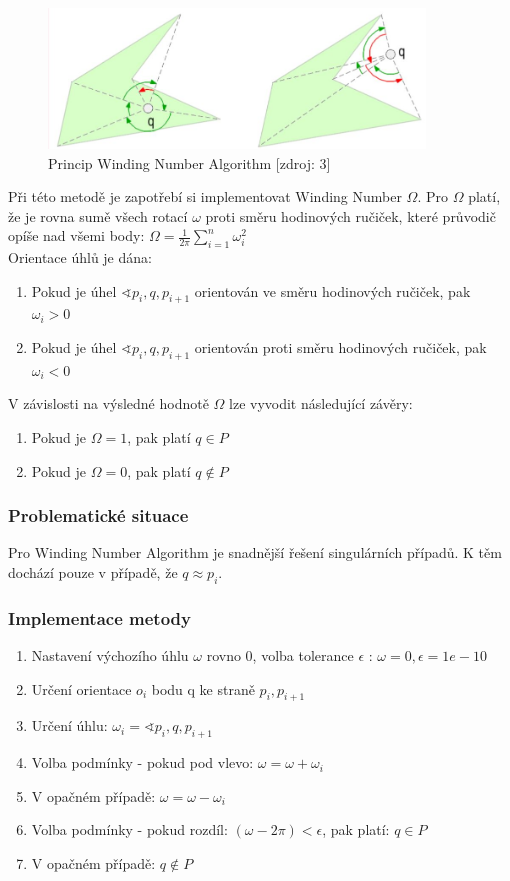 \documentclass[a4paper, 12pt]{article}
\begin{document}
\begin{figure}[h]
	\centering
	\includegraphics[width=10cm]{winding.jpg}
	\caption{Princip Winding Number Algorithm [zdroj: 3]}
\end{figure}

Při této metodě je zapotřebí si implementovat Winding Number $\Omega$. Pro $\Omega$ platí, že je rovna sumě všech rotací $\omega$ proti směru hodinových ručiček, které průvodič opíše nad všemi body: $ \Omega = \frac{1}{2\pi} \sum_{i=1}^n \omega_i^2$
\\
Orientace úhlů je dána:
\begin{enumerate}
\item Pokud je úhel $\sphericalangle p_i, q, p_{i+1}$ orientován ve směru hodinových ručiček, pak $\omega_i > 0$
\item Pokud je úhel $\sphericalangle p_i, q, p_{i+1}$ orientován proti směru hodinových ručiček, pak $\omega_i < 0$
\end{enumerate}


V závislosti na výsledné hodnotě $\Omega$ lze vyvodit následující závěry:
\begin{enumerate}
\item Pokud je $\Omega = 1$, pak platí $q \in P$ 
\item Pokud je $\Omega = 0$, pak platí $q { \not \in } P$
\end{enumerate}

\subsubsection{Problematické situace}
Pro Winding Number Algorithm je snadnější řešení singulárních případů. K těm dochází pouze v případě, že $q \approx p_i$.

\subsubsection{Implementace metody}
\begin{enumerate}
\item Nastavení výchozího úhlu $\omega$ rovno 0, volba tolerance $\epsilon$ : $\omega = 0, \epsilon = 1e-10$
\item Určení orientace $o_i$ bodu q ke straně $p_i, p_{i+1}$
\item Určení úhlu: $\omega_i = \sphericalangle p_i, q, p_{i+1}$
\item Volba podmínky - pokud pod vlevo: $\omega = \omega + \omega_i$
\item V opačném případě: $\omega = \omega - \omega_i$
\item Volba podmínky - pokud rozdíl: $(\omega - 2\pi) < \epsilon$, pak platí: $q \in P$
\item V opačném případě:  $ q { \not \in } P $
\end{enumerate}
\end{document}

